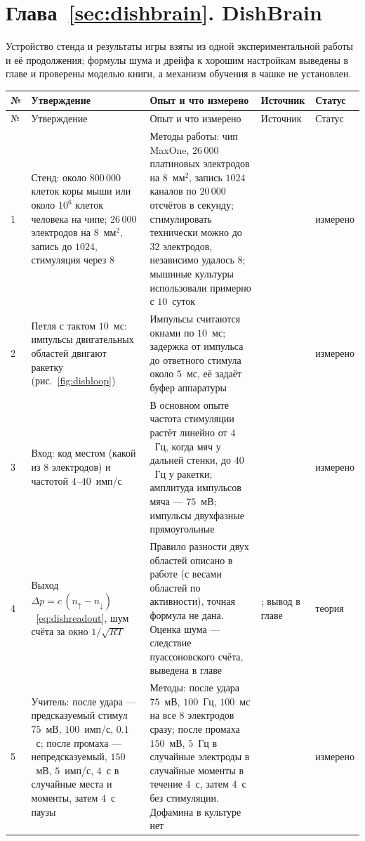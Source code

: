 \section{Глава~\ref{sec:dishbrain}. DishBrain}

Устройство стенда и результаты игры взяты из одной экспериментальной работы и её продолжения; формулы шума и дрейфа к хорошим настройкам выведены в главе и проверены моделью книги, а механизм обучения в чашке не установлен.

{\footnotesize
\setlength{\tabcolsep}{3pt}\renewcommand{\arraystretch}{1.15}
\begin{longtable}{>{\raggedright}p{0.5cm}>{\raggedright}p{4.0cm}>{\raggedright}p{5.6cm}>{\raggedright}p{2.3cm}>{\raggedright\arraybackslash}p{1.7cm}}
\toprule
№ & Утверждение & Опыт и что измерено & Источник & Статус \\
\midrule\endfirsthead
\toprule
№ & Утверждение & Опыт и что измерено & Источник & Статус \\
\midrule\endhead
1 & Стенд: около $800\,000$ клеток коры мыши или около $10^6$ клеток человека на чипе; $26\,000$ электродов на $8$~мм$^2$, запись до $1024$, стимуляция через $8$ & Методы работы: чип MaxOne, $26\,000$ платиновых электродов на $8$~мм$^2$, запись $1024$ каналов по $20\,000$ отсчётов в секунду; стимулировать технически можно до $32$ электродов, независимо удалось $8$; мышиные культуры использовали примерно с $10$~суток & \cite{Kagan2022} & измерено \\
2 & Петля с тактом $10$~мс: импульсы двигательных областей двигают ракетку (рис.~\ref{fig:dishloop}) & Импульсы считаются окнами по $10$~мс; задержка от импульса до ответного стимула около $5$~мс, её задаёт буфер аппаратуры & \cite{Kagan2022} & измерено \\
3 & Вход: код местом (какой из $8$ электродов) и частотой $4$--$40$~имп/с & В основном опыте частота стимуляции растёт линейно от $4$~Гц, когда мяч у дальней стенки, до $40$~Гц у ракетки; амплитуда импульсов мяча --- $75$~мВ; импульсы двухфазные прямоугольные & \cite{Kagan2022} & измерено \\
4 & Выход $\Delta p=c\,(n_\uparrow-n_\downarrow)$~\eqref{eq:dishreadout}, шум счёта за окно $1/\sqrt{RT}$ & Правило разности двух областей описано в работе (с весами областей по активности), точная формула не дана. Оценка шума --- следствие пуассоновского счёта, выведена в главе & \cite{Kagan2022}; вывод в главе & теория \\
5 & Учитель: после удара --- предсказуемый стимул $75$~мВ, $100$~имп/с, $0.1$~с; после промаха --- непредсказуемый, $150$~мВ, $5$~имп/с, $4$~с в случайные места и моменты, затем $4$~с паузы & Методы: после удара $75$~мВ, $100$~Гц, $100$~мс на все $8$ электродов сразу; после промаха $150$~мВ, $5$~Гц в случайные электроды в случайные моменты в течение $4$~с, затем $4$~с без стимуляции. Дофамина в культуре нет & \cite{Kagan2022} & измерено \\

\end{longtable}}
